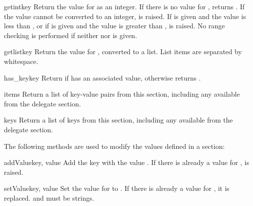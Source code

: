 \documentclass{howto}
\begin{document}
\begin{methoddesc}[Configuration]{getint}{key}
  Return the value for  as an integer.  If there is no
  value for , returns .  If the value cannot
  be converted to an integer,  is raised.  If
   is given and the value is less than , or if
   is given and the value is greater than ,
   is raised.  No range checking is performed if
  neither  nor  is given.
\end{methoddesc}

\begin{methoddesc}[Configuration]{getlist}{key}
  Return the value for , converted to a list.  List items are
  separated by whitespace.
\end{methoddesc}

\begin{methoddesc}[Configuration]{has_key}{key}
  Return  if  has an associated value, otherwise
  returns .
\end{methoddesc}

\begin{methoddesc}[Configuration]{items}{}
  Return a list of key-value pairs from this section, including any
  available from the delegate section.
\end{methoddesc}

\begin{methoddesc}[Configuration]{keys}{}
  Return a list of keys from this section, including any available
  from the delegate section.
\end{methoddesc}


The following methods are used to modify the values defined in a
section:

\begin{methoddesc}[Configuration]{addValue}{key, value}
  Add the key  with the value .  If there is
  already a value for ,  is
  raised.
\end{methoddesc}

\begin{methoddesc}[Configuration]{setValue}{key, value}
  Set the value for  to .  If there is already a
  value for , it is replaced.   and  must
  be strings.
\end{methoddesc}
\end{document}
